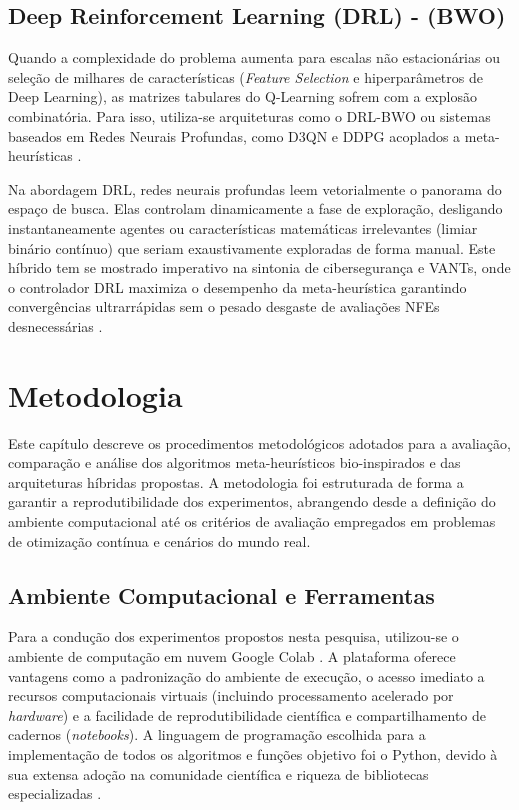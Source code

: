 \documentclass[12pt, a4paper, oneside]{report}
\begin{document}
\section{Deep Reinforcement Learning (DRL) - (BWO)}
Quando a complexidade do problema aumenta para escalas não estacionárias ou seleção de milhares de características (\textit{Feature Selection} e hiperparâmetros de Deep Learning), as matrizes tabulares do Q-Learning sofrem com a explosão combinatória. Para isso, utiliza-se arquiteturas como o DRL-BWO ou sistemas baseados em Redes Neurais Profundas, como D3QN e DDPG acoplados a meta-heurísticas \citep{praveena2022optimal}.

Na abordagem DRL, redes neurais profundas leem vetorialmente o panorama do espaço de busca. Elas controlam dinamicamente a fase de exploração, desligando instantaneamente agentes ou características matemáticas irrelevantes (limiar binário contínuo) que seriam exaustivamente exploradas de forma manual. Este híbrido tem se mostrado imperativo na sintonia de cibersegurança e VANTs, onde o controlador DRL maximiza o desempenho da meta-heurística garantindo convergências ultrarrápidas sem o pesado desgaste de avaliações NFEs desnecessárias \citep{praveena2022optimal}.

\chapter{Metodologia} \label{chap:metodologia}

Este capítulo descreve os procedimentos metodológicos adotados para a avaliação, comparação e análise dos algoritmos meta-heurísticos bio-inspirados e das arquiteturas híbridas propostas. A metodologia foi estruturada de forma a garantir a reprodutibilidade dos experimentos, abrangendo desde a definição do ambiente computacional até os critérios de avaliação empregados em problemas de otimização contínua e cenários do mundo real.

\section{Ambiente Computacional e Ferramentas}

Para a condução dos experimentos propostos nesta pesquisa, utilizou-se o ambiente de computação em nuvem Google Colab \cite{bisong2019google}. A plataforma oferece vantagens como a padronização do ambiente de execução, o acesso imediato a recursos computacionais virtuais (incluindo processamento acelerado por \textit{hardware}) e a facilidade de reprodutibilidade científica e compartilhamento de cadernos (\textit{notebooks}). A linguagem de programação escolhida para a implementação de todos os algoritmos e funções objetivo foi o Python, devido à sua extensa adoção na comunidade científica e riqueza de bibliotecas especializadas \cite{mckinney2012python}.
\end{document}
